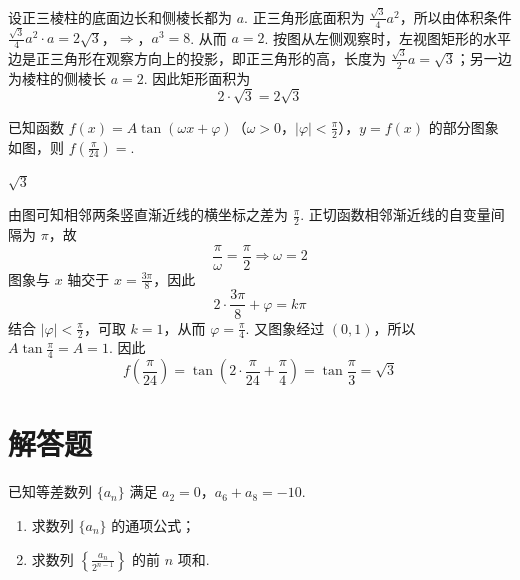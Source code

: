 \begin{solution}
设正三棱柱的底面边长和侧棱长都为 \(a\). 正三角形底面积为 \(\frac{\sqrt3}{4}a^{2}\)，所以由体积条件
\(\frac{\sqrt3}{4}a^{2}\cdot a=2\sqrt3\)，\(\Longrightarrow\)，\(a^{3}=8\).
从而 \(a=2\). 按图从左侧观察时，左视图矩形的水平边是正三角形在观察方向上的投影，即正三角形的高，长度为 \(\frac{\sqrt3}{2}a=\sqrt3\)；另一边为棱柱的侧棱长 \(a=2\). 因此矩形面积为
\[
2\cdot\sqrt3=2\sqrt3
\]
\end{solution}

\begin{problem}
已知函数 \( f(x) = A \tan (\omega x + \varphi) \)（\(\omega > 0\)，\(|\varphi| < \frac{\pi}{2}\)），\( y = f(x) \) 的部分图象如图，则 \( f\left(\frac{\pi}{24}\right) = \)\fillinblank{}.

\end{problem}

\begin{answer}
\(\sqrt{3}\)
\end{answer}

\begin{solution}
由图可知相邻两条竖直渐近线的横坐标之差为 \(\frac{\pi}{2}\). 正切函数相邻渐近线的自变量间隔为 \(\pi\)，故
\[
\frac{\pi}{\omega}=\frac{\pi}{2}\Longrightarrow \omega=2
\]
图象与 \(x\) 轴交于 \(x=\frac{3\pi}{8}\)，因此
\[
2\cdot\frac{3\pi}{8}+\varphi=k\pi
\]
结合 \(\lvert\varphi\rvert<\frac{\pi}{2}\)，可取 \(k=1\)，从而 \(\varphi=\frac{\pi}{4}\). 又图象经过 \((0,1)\)，所以 \(A\tan\frac{\pi}{4}=A=1\). 因此
\[
f\left(\frac{\pi}{24}\right)
=\tan\left(2\cdot\frac{\pi}{24}+\frac{\pi}{4}\right)
=\tan\frac{\pi}{3}
=\sqrt3
\]
\end{solution}

\section{解答题}

\begin{problem}
已知等差数列 \(\{a_{n}\}\) 满足 \(a_{2} = 0\)，\(a_{6} + a_{8} = -10\).
\begin{enumerate}
\item 求数列 \( \{a_{n}\} \) 的通项公式；
\item 求数列 \( \left\{\frac{a_{n}}{2^{n-1}}\right\} \) 的前 \(n\) 项和.
\end{enumerate}
\end{problem}

